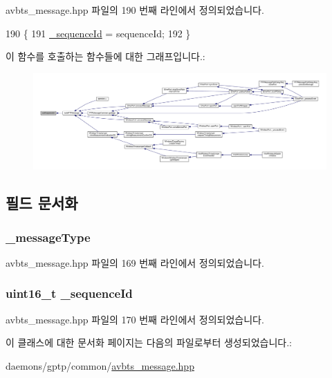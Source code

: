 avbts\+\_\+message.\+hpp 파일의 190 번째 라인에서 정의되었습니다.


\begin{DoxyCode}
190                                             \{
191         \hyperlink{class_p_t_p_message_id_a8be1fa79bd83ac24f3d0cc0d80d6d8f4}{\_sequenceId} = sequenceId;
192     \}
\end{DoxyCode}


이 함수를 호출하는 함수들에 대한 그래프입니다.\+:
\nopagebreak
\begin{figure}[H]
\begin{center}
\leavevmode
\includegraphics[width=350pt]{class_p_t_p_message_id_a1a24ddc853c27de51012c1904f4181fe_icgraph}
\end{center}
\end{figure}




\subsection{필드 문서화}
\subsubsection[{\texorpdfstring{\+\_\+message\+Type}{_messageType}}]{ \+\_\+message\+Type\hspace{0.3cm}{\ttfamily [private]}}\hypertarget{class_p_t_p_message_id_ae8e355e37a0e83fbb846b7ee23900fe9}{}\label{class_p_t_p_message_id_ae8e355e37a0e83fbb846b7ee23900fe9}


avbts\+\_\+message.\+hpp 파일의 169 번째 라인에서 정의되었습니다.

\subsubsection[{\texorpdfstring{\+\_\+sequence\+Id}{_sequenceId}}]{\setlength{\rightskip}{0pt plus 5cm}uint16\+\_\+t \+\_\+sequence\+Id\hspace{0.3cm}{\ttfamily [private]}}\hypertarget{class_p_t_p_message_id_a8be1fa79bd83ac24f3d0cc0d80d6d8f4}{}\label{class_p_t_p_message_id_a8be1fa79bd83ac24f3d0cc0d80d6d8f4}


avbts\+\_\+message.\+hpp 파일의 170 번째 라인에서 정의되었습니다.



이 클래스에 대한 문서화 페이지는 다음의 파일로부터 생성되었습니다.\+:\begin{DoxyCompactItemize}
\item 
daemons/gptp/common/\hyperlink{avbts__message_8hpp}{avbts\+\_\+message.\+hpp}\end{DoxyCompactItemize}
